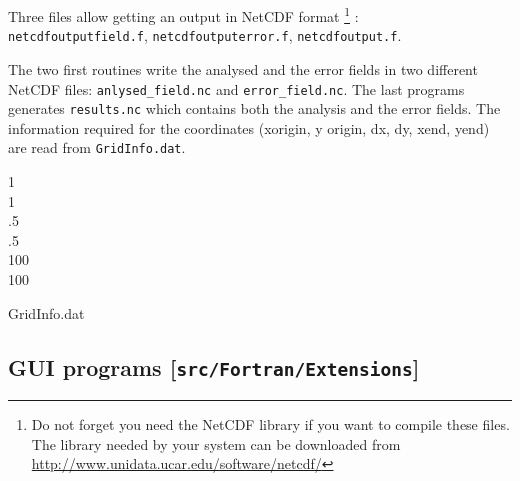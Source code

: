 Three files allow getting an output in NetCDF format \footnote{Do not forget you need the NetCDF library if you want to compile these files. The library needed by your system can be downloaded from\\
\url{http://www.unidata.ucar.edu/software/netcdf/}}
:\\ 
\texttt{netcdfoutputfield.f}, \texttt{netcdfoutputerror.f}, \texttt{netcdfoutput.f}. 

The two first routines write the analysed and the error fields in two different NetCDF files: \texttt{anlysed\_field.nc} and \texttt{error\_field.nc}. The last programs generates \texttt{results.nc} which contains both the analysis and the error fields. The information required for the coordinates (xorigin, y origin, dx, dy, xend, yend) are read from \texttt{GridInfo.dat}.

\begin{exfile}[H]
1\\
1\\
.5\\
 .5\\
100\\
100
\caption{GridInfo.dat}
\end{exfile}


\subsection[GUI programs]{GUI programs [\texttt{src/Fortran/Extensions}]}


